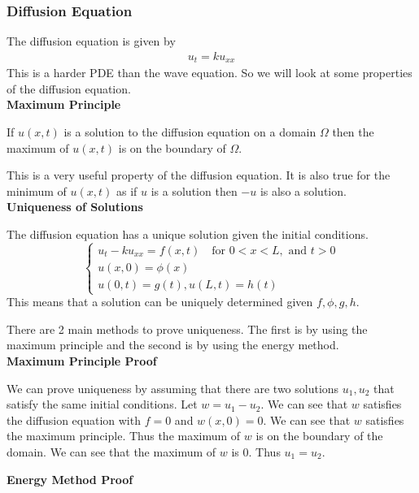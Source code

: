 \documentclass[answers,12pt,addpoints]{exam}
\begin{document}
    \subsubsection{Diffusion Equation}
    The diffusion equation is given by
    \begin{align*}
        u_t = k u_{xx}
    \end{align*}
    This is a harder PDE than the wave equation. So we will look at some properties of the diffusion equation.\\
    \textbf{Maximum Principle}
    \begin{theorem}
        If $u(x, t)$ is a solution to the diffusion equation on a domain $\Omega$ then the maximum of $u(x, t)$ is on the boundary of $\Omega$.
    \end{theorem}
    This is a very useful property of the diffusion equation. It is also true for the minimum of $u(x, t)$ as if $u$ is a solution then $-u$ is also a solution.\\
    \textbf{Uniqueness of Solutions}
    \begin{theorem}
        The diffusion equation has a unique solution given the initial conditions.
        $$ \begin{cases}
            u_t - k u_{xx} = f(x,t) \quad \text{for } 0 < x < L, \text{ and } t>0\\
            u(x, 0) = \phi(x)\\
            u(0,t) = g(t), u(L, t) = h(t)
        \end{cases}$$
        This means that a solution can be uniquely determined given $f, \phi, g, h$.
    \end{theorem}
    There are 2 main methods to prove uniqueness. The first is by using the maximum principle and the second is by using the energy method.\\
    \textbf{Maximum Principle Proof}
    \begin{solution}
        We can prove uniqueness by assuming that there are two solutions $u_1, u_2$ that satisfy the same initial conditions. Let $w = u_1 - u_2$. We can see that $w$ satisfies the diffusion equation with $f = 0$ and $w(x, 0) = 0$. We can see that $w$ satisfies the maximum principle. Thus the maximum of $w$ is on the boundary of the domain. We can see that the maximum of $w$ is 0. Thus $u_1 = u_2$.
    \end{solution}
    \textbf{Energy Method Proof}
\end{document}
